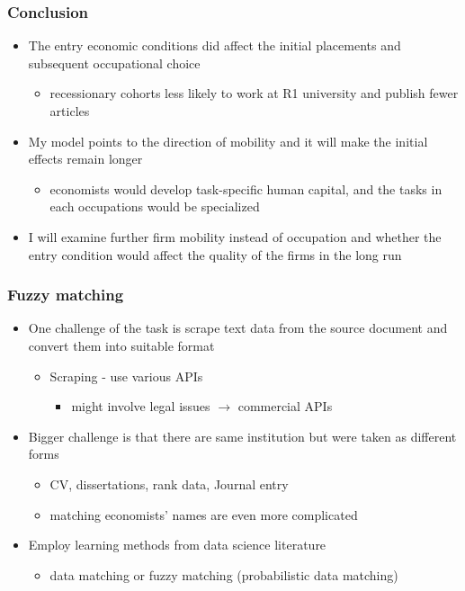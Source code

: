 \documentclass[11pt]{beamer}
\begin{document}
\begin{frame}
	\frametitle{Conclusion}
	\begin{itemize}
		\item The entry economic conditions did affect the initial placements and subsequent occupational choice
		\begin{itemize}
			\item recessionary cohorts less likely to work at R1 university and publish fewer articles
		\end{itemize}
	\item My model points to the direction of mobility and it will make the initial effects remain longer
	\begin{itemize}
		\item economists would develop task-specific human capital, and the tasks in each occupations would be specialized
	\end{itemize}
		\item I will examine further firm mobility instead of occupation and whether the entry condition would affect the quality of the firms in the long run
	\end{itemize}
\end{frame}



\begin{frame}[label=appendix]
	\frametitle{Fuzzy matching}
	\begin{itemize}
		\item One challenge of the task is scrape text data from the source document and convert them into suitable format
		\begin{itemize}
			\item Scraping - use various APIs 
			\begin{itemize}
				\item might involve legal issues $\rightarrow$ commercial APIs
			\end{itemize}
		\end{itemize} 
		\item Bigger challenge is that there are same institution but were taken as different forms 
		\begin{itemize}
			\item CV, dissertations, rank data, Journal entry
			\item matching economists' names are even more complicated
		\end{itemize}
			\item Employ learning methods from data science literature
			\begin{itemize}
				\item data matching or fuzzy matching (probabilistic data matching)
			\end{itemize}
	\end{itemize}
\end{frame}
\end{document}
